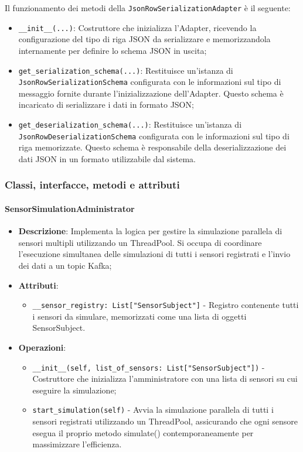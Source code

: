 \documentclass[10pt]{article}
\begin{document}
    Il funzionamento dei metodi della \texttt{JsonRowSerializationAdapter} è il seguente:
    \begin{itemize}
        \item \texttt{\_\_init\_\_(...)}: Costruttore che inizializza l'Adapter, ricevendo la configurazione del tipo di riga JSON da serializzare e memorizzandola internamente per definire lo schema JSON in uscita;
        \item \texttt{get\_serialization\_schema(...)}: Restituisce un'istanza di \texttt{JsonRowSerializationSchema} configurata con le informazioni sul tipo di messaggio fornite durante l'inizializzazione dell'Adapter. Questo schema è incaricato di serializzare i dati in formato JSON;
        \item \texttt{get\_deserialization\_schema(...)}: Restituisce un'istanza di \texttt{JsonRowDeserializationSchema} configurata con le informazioni sul tipo di riga memorizzate. Questo schema è responsabile della deserializzazione dei dati JSON in un formato utilizzabile dal sistema.
    \end{itemize}

    \subsubsection{Classi, interfacce, metodi e attributi}
    
    \paragraph{SensorSimulationAdministrator}
    \begin{itemize} 
    \item \textbf{Descrizione}: Implementa la logica per gestire la simulazione parallela di sensori multipli utilizzando un ThreadPool. Si occupa di coordinare l'esecuzione simultanea delle simulazioni di tutti i sensori registrati e l'invio dei dati a un topic Kafka;
    \item \textbf{Attributi}:
    \begin{itemize}
        \item \texttt{\_\_sensor\_registry: List["SensorSubject"]} - Registro contenente tutti i sensori da simulare, memorizzati come una lista di oggetti SensorSubject.
    \end{itemize}
    
    \item \textbf{Operazioni}:
    \begin{itemize}
        \item \texttt{\_\_init\_\_(self, list\_of\_sensors: List["SensorSubject"])} - Costruttore che inizializza l'amministratore con una lista di sensori su cui eseguire la simulazione;
        
        \item \texttt{start\_simulation(self)} - Avvia la simulazione parallela di tutti i sensori registrati utilizzando un ThreadPool, assicurando che ogni sensore esegua il proprio metodo simulate() contemporaneamente per massimizzare l'efficienza.
    \end{itemize}
    \end{itemize}
\end{document}

